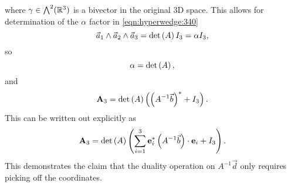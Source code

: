 where \( \gamma \in \bigwedge^2(\mathbb{R}^3) \) is a bivector in the original 3D space.  This allows for determination of the \( \alpha \) factor in \cref{eqn:hyperwedge:340}
\begin{equation}\label{eqn:hyperwedge:400}
\vec{a}_1 \wedge \vec{a}_2 \wedge \vec{a}_3
= \det\left(A\right) I_3 = \alpha I_3,
\end{equation}
so
\begin{equation}\label{eqn:hyperwedge:420}
\alpha = \det\left(A\right),
\end{equation}
and
\begin{equation}\label{eqn:hyperwedge:440}
\mathbf{A}_3
=
\det\left(A\right) \left(
   \left(A^{-1} \vec{b}\right)^{*} + I_3
\right).
\end{equation}
This can be written out explicitly as
\begin{equation}\label{eqn:hyperwedge:460}
\mathbf{A}_3
=
\det\left(A\right) \left(
   \sum_{i = 1}^3
\mathbf{e}_i^{*}
\left(A^{-1} \vec{b}\right) \cdot \mathbf{e}_i
+ I_3
\right).
\end{equation}
This demonstrates the claim that the duality operation on \( A^{-1} \vec{d} \) only requires picking off the coordinates.


